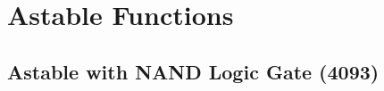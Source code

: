 \documentclass[11pt, openright]{book}
\begin{document}




\newpage

\section{Astable Functions}
\subsection{Astable with NAND Logic Gate (4093)}

\begin{figure}[ht]
    \begin{floatrow}
        

\end{floatrow}
\end{figure}
\end{document}
